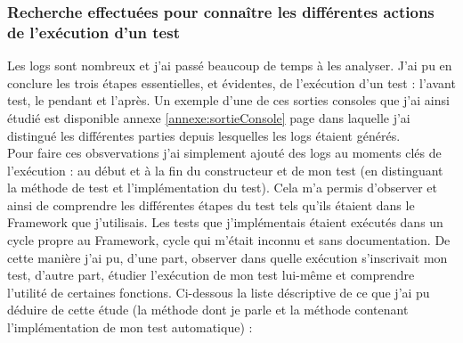 \subsubsection{Recherche effectu\'{e}es pour conna\^{i}tre les diff\'{e}rentes actions de l'ex\'{e}cution d'un test}
Les logs sont nombreux et j'ai pass\'{e} beaucoup de temps \`{a} les analyser. J'ai pu en conclure les trois \'{e}tapes essentielles, et \'{e}videntes, de l'ex\'{e}cution d'un test : l'avant test, le pendant et l'apr\`{e}s. Un exemple d'une de ces sorties consoles que j'ai ainsi \'{e}tudi\'{e} est disponible annexe \ref{annexe:sortieConsole} page \pageref{annexe:sortieConsole} dans laquelle j'ai distingu\'{e} les diff\'{e}rentes parties depuis lesquelles les logs \'{e}taient g\'{e}n\'{e}r\'{e}s.\\
Pour faire ces obsvervations j'ai simplement ajout\'{e} des logs au moments cl\'{e}s de l'ex\'{e}cution : au d\'{e}but et \`{a} la fin du constructeur et de mon test (en distinguant la m\'{e}thode de test et l'impl\'{e}mentation du test). Cela m'a permis d'observer et ainsi de comprendre les diff\'{e}rentes \'{e}tapes du test tels qu'ils \'{e}taient dans le \gls{Framework} que j'utilisais. Les tests que j'impl\'{e}mentais \'{e}taient ex\'{e}cut\'{e}s dans un cycle propre au \gls{Framework}, cycle qui m'\'{e}tait inconnu et sans documentation. De cette mani\`{e}re j'ai pu, d'une part, observer dans quelle ex\'{e}cution s'inscrivait mon test, d'autre part, \'{e}tudier l'ex\'{e}cution de mon test lui-m\^{e}me et comprendre l'utilit\'{e} de certaines fonctions. Ci-dessous la liste d\'{e}scriptive de ce que j'ai pu d\'{e}duire de cette \'{e}tude (la m\'{e}thode  dont je parle et la m\'{e}thode contenant l'impl\'{e}mentation de mon test automatique) :

